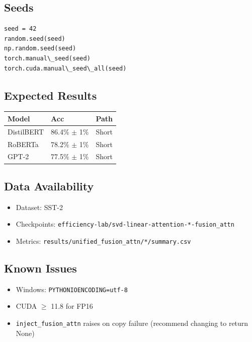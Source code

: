 \subsection{Seeds}

\begin{lstlisting}
seed = 42
random.seed(seed)
np.random.seed(seed)
torch.manual\_seed(seed)
torch.cuda.manual\_seed\_all(seed)
\end{lstlisting}

\subsection{Expected Results}

\begin{table}[H]
\centering
\small
\begin{tabular}{lll}
\toprule
\textbf{Model} & \textbf{Acc} & \textbf{Path} \\
\midrule
DistilBERT & 86.4\% $\pm$ 1\% & Short \\
RoBERTa & 78.2\% $\pm$ 1\% & Short \\
GPT-2 & 77.5\% $\pm$ 1\% & Short \\
\bottomrule
\end{tabular}
\end{table}

\subsection{Data Availability}

\begin{itemize}
\item Dataset: SST-2
\item Checkpoints: \texttt{efficiency-lab/svd-linear-attention-*-fusion\_attn}
\item Metrics: \texttt{results/unified\_fusion\_attn/*/summary.csv}

\end{itemize}
\subsection{Known Issues}

\begin{itemize}
\item Windows: \texttt{PYTHONIOENCODING=utf-8}
\item CUDA $\ge$ 11.8 for FP16
\item \texttt{inject\_fusion\_attn} raises on copy failure (recommend changing to return None)

\end{itemize}
